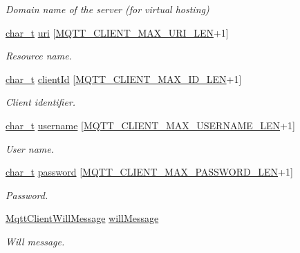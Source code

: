 \begin{DoxyCompactItemize}
\begin{DoxyCompactList}\small\item\em Domain name of the server (for virtual hosting) \end{DoxyCompactList}\item 
\hyperlink{compiler__port_8h_a40bb5262bf908c328fbcfbe5d29d0201}{char\+\_\+t} \hyperlink{structMqttClientSettings_adc38578e377b3a7cdd8bf5405ee02e52}{uri} \mbox{[}\hyperlink{mqtt__client_8h_afb740f6c70e916097ed4d81f7ba8097e}{M\+Q\+T\+T\+\_\+\+C\+L\+I\+E\+N\+T\+\_\+\+M\+A\+X\+\_\+\+U\+R\+I\+\_\+\+L\+EN}+1\mbox{]}
\begin{DoxyCompactList}\small\item\em Resource name. \end{DoxyCompactList}\item 
\hyperlink{compiler__port_8h_a40bb5262bf908c328fbcfbe5d29d0201}{char\+\_\+t} \hyperlink{structMqttClientSettings_a8316f4c900445b52de57fe9f1bcdaedb}{client\+Id} \mbox{[}\hyperlink{mqtt__client_8h_ae1cf7417055562d99c68bea4c578494e}{M\+Q\+T\+T\+\_\+\+C\+L\+I\+E\+N\+T\+\_\+\+M\+A\+X\+\_\+\+I\+D\+\_\+\+L\+EN}+1\mbox{]}
\begin{DoxyCompactList}\small\item\em Client identifier. \end{DoxyCompactList}\item 
\hyperlink{compiler__port_8h_a40bb5262bf908c328fbcfbe5d29d0201}{char\+\_\+t} \hyperlink{structMqttClientSettings_a1bb2237c5c930fc36b8048a3cf96a3fd}{username} \mbox{[}\hyperlink{mqtt__client_8h_a7412bacef3d152d0fbb35689ac123c6f}{M\+Q\+T\+T\+\_\+\+C\+L\+I\+E\+N\+T\+\_\+\+M\+A\+X\+\_\+\+U\+S\+E\+R\+N\+A\+M\+E\+\_\+\+L\+EN}+1\mbox{]}
\begin{DoxyCompactList}\small\item\em User name. \end{DoxyCompactList}\item 
\hyperlink{compiler__port_8h_a40bb5262bf908c328fbcfbe5d29d0201}{char\+\_\+t} \hyperlink{structMqttClientSettings_a7ab23630ef83e2b04878c570414443da}{password} \mbox{[}\hyperlink{mqtt__client_8h_aca81e074a297064ed384ac6ad661c228}{M\+Q\+T\+T\+\_\+\+C\+L\+I\+E\+N\+T\+\_\+\+M\+A\+X\+\_\+\+P\+A\+S\+S\+W\+O\+R\+D\+\_\+\+L\+EN}+1\mbox{]}
\begin{DoxyCompactList}\small\item\em Password. \end{DoxyCompactList}\item 
\hyperlink{structMqttClientWillMessage}{Mqtt\+Client\+Will\+Message} \hyperlink{structMqttClientSettings_a3366048bd998f90371fb2cddd8549aa6}{will\+Message}
\begin{DoxyCompactList}\small\item\em Will message. \end{DoxyCompactList}\end{DoxyCompactItemize}


